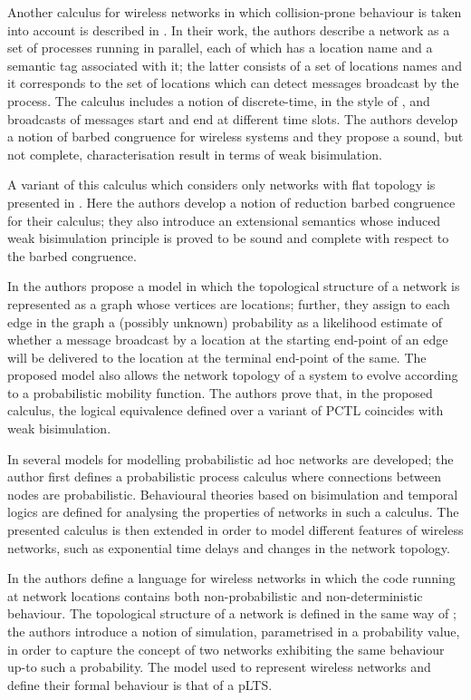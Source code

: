 \documentclass{LMCS}
\begin{document}
Another calculus for wireless networks in which collision-prone behaviour is taken 
into account is described in \cite{merro}. In their work, the authors 
describe a network as a set of processes running in parallel, each of 
which has a location name and a semantic tag associated with it; the latter 
consists of a set of locations names and it corresponds to the set 
of locations which can detect messages broadcast by the process. 
The calculus includes a notion of discrete-time, in the style of 
\cite{HenReg95}, and broadcasts of messages start and end at different 
time slots. The authors develop a notion of barbed congruence for 
wireless systems and they 
propose a sound, but not complete, characterisation result in terms 
of weak bisimulation. 

A variant of this calculus which considers only networks with 
flat topology is presented in \cite{CHM12}. Here the 
authors develop a notion of reduction barbed congruence for their 
calculus; they 
also introduce an extensional semantics whose induced weak 
bisimulation principle is proved to be sound and complete 
with respect to the barbed congruence.

In \cite{GodSon} the authors propose a model in which the topological 
structure of a network is represented as a graph whose vertices are 
locations; further, they assign 
to each edge in the graph a (possibly unknown) probability as a likelihood estimate of 
whether a message broadcast by a location at the starting end-point of an 
edge will be delivered to the location at the terminal end-point of the same. 
The proposed model also allows the network topology of a system to 
evolve according to a probabilistic mobility function. 
The authors prove that, in the proposed calculus, the logical equivalence 
defined over a variant of PCTL coincides with weak bisimulation. 

In \cite{songphd} several models for modelling probabilistic ad hoc networks 
are developed; the author first defines a probabilistic process calculus 
where connections between nodes are probabilistic. Behavioural theories 
based on bisimulation and temporal logics are defined for analysing the properties 
of networks in such a calculus. 
The presented calculus is then extended in order to model different features of 
wireless networks, such as exponential time delays and changes in the network topology. 

In \cite{LanotteM11} the authors define a language for wireless networks 
in which the code running at network locations contains both non-probabilistic 
and non-deterministic behaviour. The topological structure of a network 
is defined in the same way of \cite{merro}; the authors introduce a 
notion of simulation, parametrised in a probability value, in order 
to capture the concept of two networks exhibiting the same behaviour 
up-to such a probability. The model used to represent wireless networks 
and define their formal behaviour is that of a pLTS.
\end{document}
